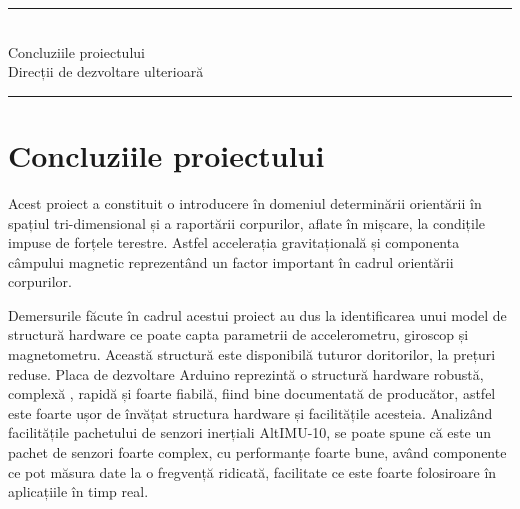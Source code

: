 


\label{Chapter8} %
\noindent\rule{14.7cm}{0.4pt}\\
\-\hspace{1cm} Concluziile proiectului\\
\-\hspace{1cm} Direcții de dezvoltare ulterioară\\
\noindent\rule{14.7cm}{0.4pt}

%


\fancyhead[R]{\fontsize{12}{12}\selectfont\emph\bfseries\textcolor{black!70}{Automatică şi \\ Informatică Aplicată}}

\section{Concluziile proiectului}
\-\hspace{1cm}Acest proiect a constituit o introducere în domeniul determinării orientării în spațiul tri-dimensional și a raportării corpurilor, aflate în mișcare, la condițile impuse de forțele terestre. Astfel accelerația gravitațională și componenta câmpului magnetic reprezentând un factor important în cadrul orientării corpurilor.

\-\hspace{1cm}Demersurile făcute în cadrul acestui proiect au dus la identificarea unui model de structură hardware ce poate capta parametrii de accelerometru, giroscop și magnetometru. Această structură este disponibilă tuturor doritorilor, la prețuri reduse. Placa de dezvoltare Arduino reprezintă o structură hardware robustă, complexă , rapidă și foarte fiabilă, fiind bine documentată de producător, astfel este foarte ușor de învățat structura hardware și facilitățile acesteia. Analizând facilitățile pachetului de senzori inerțiali AltIMU-10, se poate spune că este un pachet de senzori foarte complex, cu performanțe foarte bune, având componente ce pot măsura date la o fregvență ridicată, facilitate ce este foarte folosiroare în aplicațiile în timp real.  

